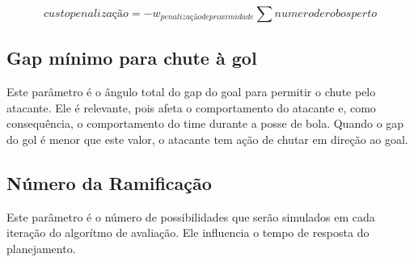 \begin{dmath}
  custo penalização = - w_{penalização de proximidade} \sum numero de robos perto
\end{dmath}

\subsection{Gap mínimo para chute à gol}
Este parâmetro é o ângulo total do gap do goal para permitir
o chute pelo atacante. Ele é relevante, pois afeta o comportamento
do atacante e, como consequência, o comportamento do time durante
a posse de bola. Quando o gap do gol é menor que este valor, o
atacante tem ação de chutar em direção ao goal.


\subsection{Número da Ramificação}
Este parâmetro é o número de possibilidades que serão simulados
em cada iteração do algorítmo de avaliação. Ele influencia o
tempo de resposta do planejamento.

